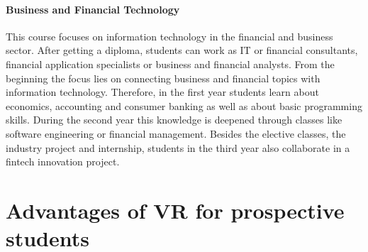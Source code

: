 \paragraph{Business and Financial Technology}
This course focuses on information technology in the financial and business sector. After getting a diploma, students can work as IT or financial consultants, financial application specialists or business and financial analysts. From the beginning the focus lies on connecting business and financial topics with information technology. Therefore, in the first year students learn about economics, accounting and consumer banking as well as about basic programming skills. During the second year this knowledge is deepened through classes like software engineering or financial management. Besides the elective classes, the industry project and internship, students in the third year also collaborate in a fintech innovation project.

\section{Advantages of VR for prospective students}


